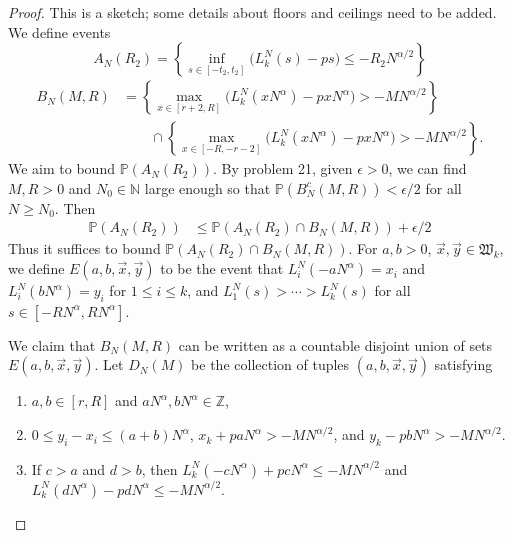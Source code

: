 \documentclass[12pt]{article}
\begin{document}
	\begin{proof}
		This is a sketch; some details about floors and ceilings need to be added. We define events
		\[
		A_N(R_2) = \left\{\inf_{s \in [ -t_2, t_2 ]}\big(L^N_k(s) - p s \big) \leq - R_2N^{\alpha/2}\right\}
		\]
		\begin{align*}
		B_N(M,R) &= \left\{ \max_{x\in [r+2, R]} \big(L^N_k(xN^\alpha) - pxN^\alpha\big) > -MN^{\alpha/2} \right\}\\
		&\qquad \cap \left\{ \max_{x\in [-R, -r-2]} \big(L^N_k(xN^\alpha) - pxN^\alpha\big) > -MN^{\alpha/2} \right\}.
		\end{align*}
		We aim to bound $\mathbb{P}(A_N(R_2))$. By problem 21, given $\epsilon > 0$, we can find $M,R>0$ and $N_0\in\mathbb{N}$ large enough so that $\mathbb{P}(B_N^c(M,R)) < \epsilon/2$ for all $N\geq N_0$. Then
		\begin{align*}
		\mathbb{P}(A_N(R_2)) &\leq \mathbb{P}(A_N(R_2)\cap B_N(M,R)) + \epsilon/2
		\end{align*}
		Thus it suffices to bound $\mathbb{P}(A_N(R_2)\cap B_N(M,R))$. For $a,b>0$, $\vec{x},\vec{y}\in\mathfrak{W}_k$, we define $E(a,b,\vec{x},\vec{y})$ to be the event that $L_i^N(-aN^\alpha) = x_i$ and $L_i^N(bN^\alpha) = y_i$ for $1\leq i\leq k$, and $L_1^N(s) > \cdots > L_k^N(s)$ for all $s\in[-RN^\alpha,RN^\alpha]$.
		
		We claim that $B_N(M,R)$ can be written as a countable disjoint union of sets $E(a,b,\vec{x},\vec{y})$. Let $D_N(M)$ be the collection of tuples $(a,b,\vec{x},\vec{y})$ satisfying 
		\begin{enumerate}[label=(\arabic*)]
			
			\item $a,b \in [r,R]$ and $aN^\alpha, bN^\alpha \in \mathbb{Z}$,
			
			\item $0 \leq y_i - x_i \leq (a+b)N^\alpha$, $x_k + paN^\alpha > - MN^{\alpha/2}$, and $y_k - pbN^\alpha > - MN^{\alpha/2}$.
			
			\item If $c > a$ and $d>b$, then $L_k^N(-cN^\alpha) + pcN^\alpha \leq -MN^{\alpha/2}$ and $L_k^N(dN^\alpha) - pdN^\alpha \leq -MN^{\alpha/2}$.
			

\end{enumerate}
\end{proof}
\end{document}

